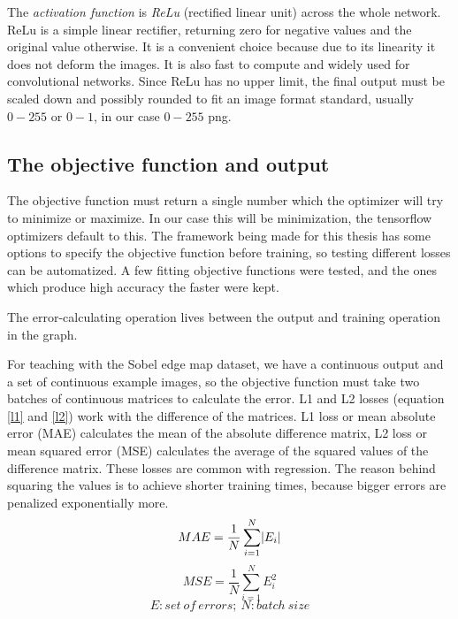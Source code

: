 \documentclass[12pt]{report}
\begin{document}
The \textit{activation function} is \textit{ReLu} (rectified linear unit) \cite{relu} across the whole network. ReLu is a simple linear rectifier, returning zero for negative values and the original value otherwise. It is a convenient choice because due to its linearity it does not deform the images. It is also fast to compute and widely used for convolutional networks. Since ReLu has no upper limit, the final output must be scaled down and possibly rounded to fit an image format standard, usually $0-255$ or $0-1$, in our case $0-255$ png.
\subsection{The objective function and output}
The objective function must return a single number which the optimizer will try to minimize or maximize. In our case this will be minimization, the tensorflow optimizers default to this. The framework being made for this thesis has some options to specify the objective function before training, so testing different losses can be automatized. A few fitting objective functions were tested, and the ones which produce high accuracy the faster were kept.\par

The error-calculating operation lives between the output and training operation in the graph.\par

For teaching with the Sobel edge map dataset, we have a continuous output and a set of continuous example images, so the objective function must take two batches of continuous matrices to calculate the error. L1 and L2 losses (equation \ref{l1} and \ref{l2}) work with the difference of the matrices. L1 loss or mean absolute error (MAE) calculates the mean of the absolute difference matrix, L2 loss or mean squared error (MSE) calculates the average of the squared values of the difference matrix. These losses are common with regression. The reason behind squaring the values is to achieve shorter training times, because bigger errors are penalized exponentially more.
\begin{equation} \label{l1}
MAE = \frac{1}{N}\sum_{i=1}^{N}\abs{E_{i}}
\end{equation}
\begin{equation} \label{l2}
MSE = \frac{1}{N}\sum_{i=1}^{N}E_{i}^{2}
\end{equation}
\begin{equation*}
E:set\ of\ errors;\ N:batch\ size
\end{equation*}
\par
\end{document}
